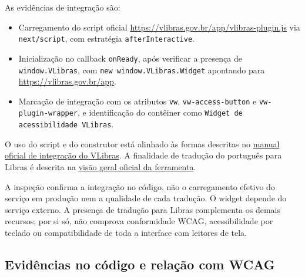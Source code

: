 \documentclass[12pt,a4paper]{article}
\begin{document}
As evidências de integração são:
\begin{itemize}
  \item Carregamento do script oficial \url{https://vlibras.gov.br/app/vlibras-plugin.js} via \texttt{next/script}, com estratégia \texttt{afterInteractive}.
  \item Inicialização no callback \texttt{onReady}, após verificar a presença de \texttt{window.VLibras}, com \texttt{new window.VLibras.Widget} apontando para \url{https://vlibras.gov.br/app}.
  \item Marcação de integração com os atributos \texttt{vw}, \texttt{vw-access-button} e \texttt{vw-plugin-wrapper}, e identificação do contêiner como \texttt{Widget de acessibilidade VLibras}.
\end{itemize}

O uso do script e do construtor está alinhado às formas descritas no \href{https://vlibras.gov.br/doc/widget/installation/webpageintegration.html}{manual oficial de integração do VLibras}. A finalidade de tradução do português para Libras é descrita na \href{https://vlibras.gov.br/doc/widget/introduction/overview.html}{visão geral oficial da ferramenta}.

A inspeção confirma a integração no código, não o carregamento efetivo do serviço em produção nem a qualidade de cada tradução. O widget depende do serviço externo. A presença de tradução para Libras complementa os demais recursos; por si só, não comprova conformidade WCAG, acessibilidade por teclado ou compatibilidade de toda a interface com leitores de tela.

\subsection{Evidências no código e relação com WCAG}
\end{document}
